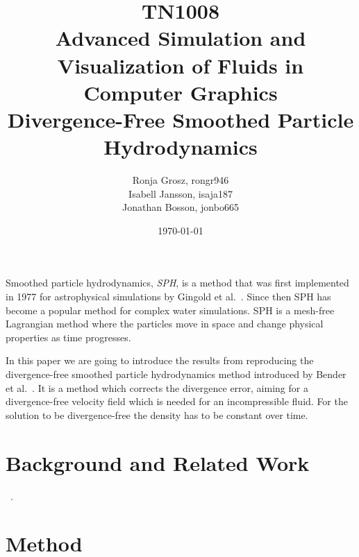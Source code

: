 \documentclass[journal]{vgtc}                %
\title{\LARGE TN1008 \\ Advanced Simulation and Visualization of Fluids in Computer Graphics \\ \Large Divergence-Free Smoothed Particle Hydrodynamics}
\author{Ronja Grosz, rongr946\\ Isabell Jansson, isaja187\\ Jonathan Bosson, jonbo665}
\date{\today}
\begin{document}
\maketitle 
    Smoothed particle hydrodynamics, \textit{SPH}, is a method that was first implemented in 1977 for astrophysical simulations by Gingold et al.~\cite{firstSPH}.
    Since then SPH has become a popular method for complex water simulations.
    SPH is a mesh-free Lagrangian method where the particles move in space and change physical properties as time progresses.
    
    In this paper we are going to introduce the results from reproducing the divergence-free smoothed particle hydrodynamics method introduced by Bender et al.~\cite{bender}.
    It is a method which corrects the divergence error, aiming for a divergence-free velocity field which is needed for an incompressible fluid.
    For the solution to be divergence-free the density has to be constant over time.
    

\section{Background and Related Work}

    ~\cite{bridson}.



\section{Method}
\end{document}
